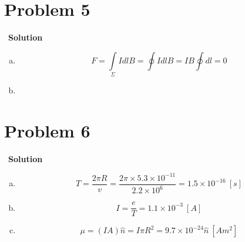 \documentclass[12pt,a4paper]{article}
\begin{document}
\section*{\large \textbf{Problem 5}}~{\textbf{Solution}}
    \begin{enumerate}[(a)]
        \item \begin{equation}
                F = \int\limits_{\Sigma} Id\textit{l}B = \oint Id\textit{l}B = IB \oint d\textit{l} = 0
            \end{equation}
        \item 
    \end{enumerate}
    


\section*{\large \textbf{Problem 6}}~{\textbf{Solution}}
    \begin{enumerate}[(a)]
        \item \begin{equation}
                T = \frac{2\pi R}{v} = \frac{2\pi\times 5.3\times 10^{-11}}{2.2\times 10^6} = 1.5\times 10^{-16}\ [s]
            \end{equation}
        \item \begin{equation}
                I = \frac{e}{T} = 1.1\times 10^{-3}\ [A] 
            \end{equation}
        \item \begin{equation}
                \mu = (IA)\hat{n} = I\pi R^2 = 9.7\times 10^{-24}\hat{n}\ [Am^2]
            \end{equation}        
    \end{enumerate}
    
    
\end{document}
